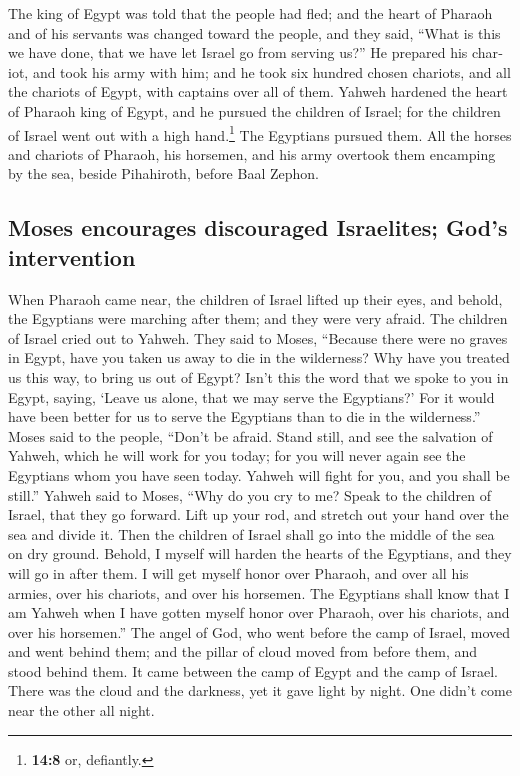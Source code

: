 \begin{paracol}{2}
\begin{otherlanguage}{english}
 The king of Egypt was told that the people had fled; and
the heart of Pharaoh and of his servants was changed toward the people,
and they said, ``What is this we have done, that we have let Israel go
from serving us?''  He prepared his chariot, and took his
army with him;  and he took six hundred chosen chariots,
and all the chariots of Egypt, with captains over all of them.
 Yahweh hardened the heart of Pharaoh king of Egypt, and
he pursued the children of Israel; for the children of Israel went out
with a high hand.\footnote{\textbf{14:8} or, defiantly.} 
The Egyptians pursued them. All the horses and chariots of Pharaoh, his
horsemen, and his army overtook them encamping by the sea, beside
Pihahiroth, before Baal Zephon.

\hypertarget{moses-encourages-discouraged-israelites-gods-intervention}{%
\subsection{Moses encourages discouraged Israelites; God's
intervention}\label{moses-encourages-discouraged-israelites-gods-intervention}}

 When Pharaoh came near, the children of Israel lifted up
their eyes, and behold, the Egyptians were marching after them; and they
were very afraid. The children of Israel cried out to Yahweh.
 They said to Moses, ``Because there were no graves in
Egypt, have you taken us away to die in the wilderness? Why have you
treated us this way, to bring us out of Egypt?  Isn't
this the word that we spoke to you in Egypt, saying, `Leave us alone,
that we may serve the Egyptians?' For it would have been better for us
to serve the Egyptians than to die in the wilderness.'' 
Moses said to the people, ``Don't be afraid. Stand still, and see the
salvation of Yahweh, which he will work for you today; for you will
never again see the Egyptians whom you have seen today. 
Yahweh will fight for you, and you shall be still.'' 
Yahweh said to Moses, ``Why do you cry to me? Speak to the children of
Israel, that they go forward.  Lift up your rod, and
stretch out your hand over the sea and divide it. Then the children of
Israel shall go into the middle of the sea on dry ground.
 Behold, I myself will harden the hearts of the
Egyptians, and they will go in after them. I will get myself honor over
Pharaoh, and over all his armies, over his chariots, and over his
horsemen.  The Egyptians shall know that I am Yahweh when
I have gotten myself honor over Pharaoh, over his chariots, and over his
horsemen.''  The angel of God, who went before the camp
of Israel, moved and went behind them; and the pillar of cloud moved
from before them, and stood behind them.  It came between
the camp of Egypt and the camp of Israel. There was the cloud and the
darkness, yet it gave light by night. One didn't come near the other all
night.


\end{otherlanguage}
\end{paracol}
